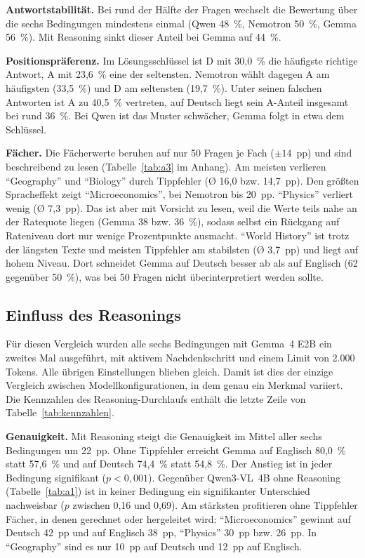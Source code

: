\documentclass[a4paper,titlepage]{article}
\numberwithin{equation}{section} %
\begin{document}
\textbf{Antwortstabilität.} Bei rund der Hälfte der Fragen wechselt die Bewertung über die sechs Bedingungen mindestens einmal (Qwen 48~\%, Nemotron 50~\%, Gemma 56~\%). Mit Reasoning sinkt dieser Anteil bei Gemma auf 44~\%.

\textbf{Positionspräferenz.} Im Lösungsschlüssel ist D mit 30,0~\% die häufigste richtige Antwort, A mit 23,6~\% eine der seltensten. Nemotron wählt dagegen A am häufigsten (33,5~\%) und D am seltensten (19,7~\%). Unter seinen falschen Antworten ist A zu 40,5~\% vertreten, auf Deutsch liegt sein A-Anteil insgesamt bei rund 36~\%. Bei Qwen ist das Muster schwächer, Gemma folgt in etwa dem Schlüssel.

\textbf{Fächer.} Die Fächerwerte beruhen auf nur 50 Fragen je Fach ($\pm 14$~pp) und sind beschreibend zu lesen (Tabelle~\ref{tab:a3} im Anhang). Am meisten verlieren "`Geography"' und "`Biology"' durch Tippfehler (Ø 16,0 bzw. 14,7~pp). Den größten Spracheffekt zeigt "`Microeconomics"', bei Nemotron bis 20~pp. "`Physics"' verliert wenig (Ø 7,3~pp). Das ist aber mit Vorsicht zu lesen, weil die Werte teils nahe an der Ratequote liegen (Gemma 38 bzw. 36~\%), sodass selbst ein Rückgang auf Rateniveau dort nur wenige Prozentpunkte ausmacht. "`World History"' ist trotz der längsten Texte und meisten Tippfehler am stabilsten (Ø 3,7~pp) und liegt auf hohem Niveau. Dort schneidet Gemma auf Deutsch besser ab als auf Englisch (62 gegenüber 50~\%), was bei 50 Fragen nicht überinterpretiert werden sollte.


\subsection{Einfluss des Reasonings}\label{sec:reasoning}

Für diesen Vergleich wurden alle sechs Bedingungen mit Gemma~4 E2B ein zweites Mal ausgeführt, mit aktivem Nachdenkschritt und einem Limit von 2.000 Tokens. Alle übrigen Einstellungen blieben gleich. Damit ist dies der einzige Vergleich zwischen Modellkonfigurationen, in dem genau ein Merkmal variiert. Die Kennzahlen des Reasoning-Durchlaufs enthält die letzte Zeile von Tabelle~\ref{tab:kennzahlen}.

\textbf{Genauigkeit.} Mit Reasoning steigt die Genauigkeit im Mittel aller sechs Bedingungen um 22~pp. Ohne Tippfehler erreicht Gemma auf Englisch 80,0~\% statt 57,6~\% und auf Deutsch 74,4~\% statt 54,8~\%. Der Anstieg ist in jeder Bedingung signifikant ($p < 0{,}001$). Gegenüber Qwen3-VL~4B ohne Reasoning (Tabelle~\ref{tab:a1}) ist in keiner Bedingung ein signifikanter Unterschied nachweisbar ($p$ zwischen 0,16 und 0,69). Am stärksten profitieren ohne Tippfehler Fächer, in denen gerechnet oder hergeleitet wird: "`Microeconomics"' gewinnt auf Deutsch 42~pp und auf Englisch 38~pp, "`Physics"' 30~pp bzw. 26~pp. In "`Geography"' sind es nur 10~pp auf Deutsch und 12~pp auf Englisch.
\end{document}
